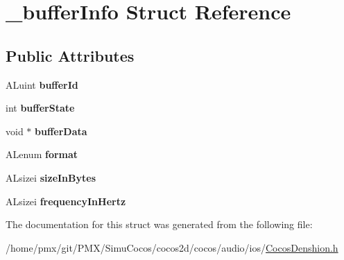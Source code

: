 \hypertarget{struct__bufferInfo}{}\section{\+\_\+buffer\+Info Struct Reference}
\label{struct__bufferInfo}
\subsection*{Public Attributes}
\begin{DoxyCompactItemize}
\item 
\mbox{\label{struct__bufferInfo_ada9a4b0d226243291982b16fd0aa4320}} 
A\+Luint {\bfseries buffer\+Id}
\item 
\mbox{\label{struct__bufferInfo_a7ec9ded79929d9a8d532e8847cffe18e}} 
int {\bfseries buffer\+State}
\item 
\mbox{\label{struct__bufferInfo_a214908997f344969d4306b8184dec586}} 
void $\ast$ {\bfseries buffer\+Data}
\item 
\mbox{\label{struct__bufferInfo_ac74dea7e65809ec13a1d8fa2981bdffe}} 
A\+Lenum {\bfseries format}
\item 
\mbox{\label{struct__bufferInfo_a0ab48cabebb4e040758bbd751e2eaf1c}} 
A\+Lsizei {\bfseries size\+In\+Bytes}
\item 
\mbox{\label{struct__bufferInfo_add13810b4e5f1cde5ae260bcc427e9a6}} 
A\+Lsizei {\bfseries frequency\+In\+Hertz}
\end{DoxyCompactItemize}


The documentation for this struct was generated from the following file\+:\begin{DoxyCompactItemize}
\item 
/home/pmx/git/\+P\+M\+X/\+Simu\+Cocos/cocos2d/cocos/audio/ios/\hyperlink{cocos2d_2cocos_2audio_2ios_2CocosDenshion_8h}{Cocos\+Denshion.\+h}\end{DoxyCompactItemize}
